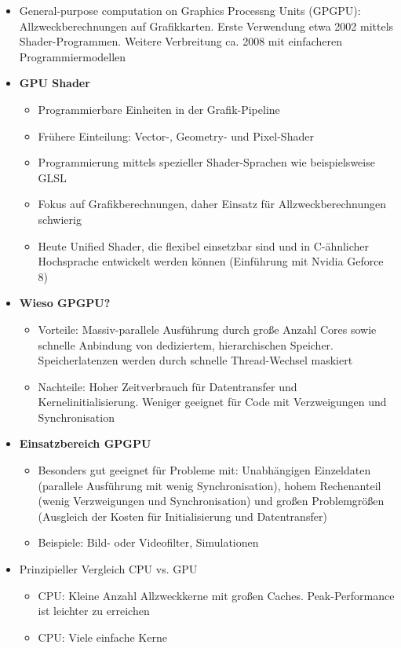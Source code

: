 \begin{itemize}
	\item General-purpose computation on Graphics Processng Units (GPGPU): Allzweckberechnungen auf Grafikkarten. Erste Verwendung etwa 2002 mittels Shader-Programmen. Weitere Verbreitung ca. 2008 mit einfacheren Programmiermodellen
	\item \textbf{GPU Shader}
	\begin{itemize}
		\item Programmierbare Einheiten in der Grafik-Pipeline
		\item Frühere Einteilung: Vector-, Geometry- und Pixel-Shader
		\item Programmierung mittels spezieller Shader-Sprachen wie beispielsweise GLSL
		\item Fokus auf Grafikberechnungen, daher Einsatz für Allzweckberechnungen schwierig
		\item Heute Unified Shader, die flexibel einsetzbar sind und in C-ähnlicher Hochsprache entwickelt werden können (Einführung mit Nvidia Geforce 8)
	\end{itemize}
	\item \textbf{Wieso GPGPU?}
	\begin{itemize}
		\item Vorteile: Massiv-parallele Ausführung durch große Anzahl Cores sowie schnelle Anbindung von dediziertem, hierarchischen Speicher. Speicherlatenzen werden durch schnelle Thread-Wechsel maskiert
		\item Nachteile: Hoher Zeitverbrauch für Datentransfer und Kernelinitialisierung. Weniger geeignet für Code mit Verzweigungen und Synchronisation
	\end{itemize}
	\item \textbf{Einsatzbereich GPGPU}
	\begin{itemize}
		\item Besonders gut geeignet für Probleme mit: Unabhängigen Einzeldaten (parallele Ausführung mit wenig Synchronisation), hohem Rechenanteil (wenig Verzweigungen und Synchronisation) und großen Problemgrößen (Ausgleich der Kosten für Initialisierung und Datentransfer)
		\item Beispiele: Bild- oder Videofilter, Simulationen
	\end{itemize}
	\item Prinzipieller Vergleich CPU vs. GPU
	\begin{itemize}
		\item CPU: Kleine Anzahl Allzweckkerne mit großen Caches. Peak-Performance ist leichter zu erreichen
		\item CPU: Viele einfache Kerne
	\end{itemize}
\end{itemize}



